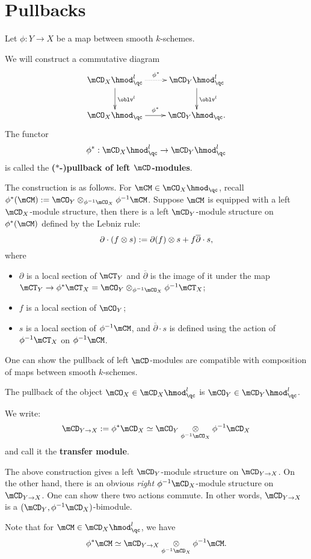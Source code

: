 \section{Pullbacks}

	Let $\phi: Y\to X$ be a map between smooth $k$-schemes.
	
	\begin{constr}
		We will construct a commutative diagram
		\[
			\xymatrix{
				\mCD_X\hmod^l_\qc \ar@{.>}[r]^-{\phi^*} \ar[d]^-{\oblv^l} &
				\mCD_Y\hmod^l_\qc \ar[d]^-{\oblv^l} \\
				\mCO_X\hmod_\qc \ar[r]^-{\phi^*} & \mCO_Y\hmod_\qc.
			}
		\]
		The functor 
		\[
			\phi^*: \mCD_X\hmod^l_\qc \to \mCD_Y\hmod^l_\qc
		\]
		is called the \textbf{($*$-)pullback of left $\mCD$-modules}.

		The construction is as follows. For $\mCM\in \mCO_X\hmod_\qc$, recall $\phi^*(\mCM):= \mCO_Y \ot_{\phi^{-1}\mCO_X} \phi^{-1}\mCM$. Suppose $\mCM$ is equipped with a left $\mCD_X$-module structure, then there is a left $\mCD_Y$-module structure on $\phi^*(\mCM)$ defined by the Lebniz rule:
		\[
			\partial \cdot ( f\ot  s) :=  \partial(f) \ot s + f \overline{\partial} \cdot s,
		\]
		where
		\begin{itemize}
			\item 
				$\partial$ is a local section of $\mCT_Y$ and $\overline{\partial}$ is the image of it under the map $\mCT_Y \to \phi^*\mCT_X = \mCO_Y \ot_{\phi^{-1}\mCO_X} \phi^{-1}\mCT_X  $;
			\item
				$f$ is a local section of $\mCO_Y$;
			\item
				$s$ is a local section of $\phi^{-1}\mCM$, and $\overline{\partial}\cdot s$ is defined using the action of $\phi^{-1}\mCT_X$ on $\phi^{-1}\mCM$.
		\end{itemize}
	\end{constr}

	\begin{rem}
		One can show the pullback of left $\mCD$-modules are compatible with composition of maps between smooth $k$-schemes.
	\end{rem}

	\begin{exam}
		The pullback of the object $\mCO_X\in \mCD_X\hmod^l_\qc$ is $\mCO_Y\in \mCD_Y\hmod^l_\qc$.
	\end{exam}

	\begin{constr}
		We write:
		\[
			\mCD_{Y\to X}:= \phi^*\mCD_X \simeq \mCO_Y \ot_{\phi^{-1}\mCO_X} \phi^{-1}\mCD_X  
		\]
		and call it the \textbf{transfer module}.

		The above construction gives a left $\mCD_Y$-module structure on $\mCD_{Y\to X}$. On the other hand, there is an obvious \emph{right} $\phi^{-1}\mCD_X$-module structure on $\mCD_{Y\to X}$. One can show there two actions commute. In other words, $\mCD_{Y\to X}$ is a $(\mCD_Y, \phi^{-1}\mCD_X)$-bimodule.

		Note that for $\mCM \in  \mCD_X\hmod^l_\qc$, we have
		\[
			\phi^* \mCM \simeq \mCD_{Y\to X}\ot_{ \phi^{-1}\mCD_X } \phi^{-1}\mCM.
		\]
	\end{constr}

